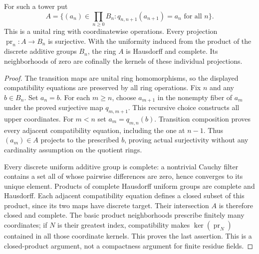 \begin{lemma}
\label{fw:truncated-norm-inverse-limit}
\leanok
For such a tower put
\[
 A=\{(a_n)\in\prod_{n\geq0}B_n:
                    q_{n,n+1}(a_{n+1})=a_n\text{ for all }n\}.
\]
This is a unital ring with coordinatewise operations. Every projection
$\operatorname{pr}_n:A\to B_n$ is surjective. With the uniformity
induced from the product of the discrete additive groups $B_n$, the
ring $A$ is Hausdorff and complete. Its neighborhoods of zero are
cofinally the kernels of these individual projections.
\end{lemma}
\begin{proof}
The transition maps are unital ring homomorphisms, so the displayed
compatibility equations are preserved by all ring operations.
Fix $n$ and any $b\in B_n$. Set $a_n=b$. For each $m\geq n$,
choose $a_{m+1}$ in the nonempty fiber of $a_m$ under the proved
surjective map $q_{m,m+1}$. This recursive choice constructs all
upper coordinates. For $m<n$ set $a_m=q_{m,n}(b)$.
Transition composition proves every adjacent compatibility equation,
including the one at $n-1$. Thus $(a_m)\in A$ projects to the prescribed
$b$, proving actual surjectivity without any cardinality assumption
on the quotient rings.

Every discrete uniform additive group is complete: a nontrivial Cauchy filter
contains a set all of whose pairwise differences are zero, hence
converges to its unique element. Products of complete Hausdorff
uniform groups are complete and Hausdorff. Each adjacent compatibility
equation defines a closed subset of this product, since its two maps
have discrete target. Their intersection $A$ is therefore closed and
complete. The basic product neighborhoods prescribe finitely many
coordinates; if $N$ is their greatest index, compatibility makes
$\ker(\operatorname{pr}_N)$ contained in all those coordinate kernels.
This proves the last assertion. This is a closed-product argument,
not a compactness argument for finite residue fields.
\end{proof}

